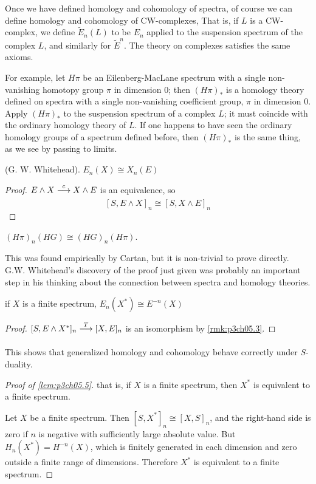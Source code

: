 \documentclass[../main]{subfiles}
\begin{document}
Once we have defined homology and cohomology of spectra, of course we can define homology and cohomology of CW-complexes, That is, if $L$ is a CW-complex, we define $\widetilde{E}_n(L)$ to be $E_n$ applied to the suspension spectrum of the complex $L$, and similarly for $\widetilde{E}^n$. The theory on complexes satisfies the same axioms.

For example, let $H\pi$ be an Eilenberg-MacLane spectrum with a single non-vanishing homotopy group $\pi$ in dimension 0; then $(H\pi)_\ast$ is a homology theory  defined on spectra with a single non-vanishing coefficient group, $\pi$ in dimension 0. Apply $(H\pi)_\ast$ to the suspension spectrum of a complex $L$; it must coincide with the ordinary homology theory of $L$. If one happens to have seen the ordinary homology groups of a spectrum defined before, then $(H\pi)_\ast$ is the same thing, as we see by passing to limits.

\begin{theorem}\label{thm:p3c06.2}
(G. W. Whitehead). $E_n(X) \cong X_n(E)$
\end{theorem}

\begin{proof}
$E\wedge X \lar{c} X \wedge E$ is an equivalence, so
\[[S, E\wedge X]_n \cong [S, X\wedge E]_n\]
\end{proof}

\begin{corollary}\label{cor:p3c06.3}
$(H\pi)_n(HG) \cong (HG)_n(H\pi)$.
\end{corollary}

This was found empirically by Cartan, but it is non-trivial to prove directly. G.W. Whitehead's discovery of the proof just given was probably an important step in his thinking about the connection between spectra and homology theories.

\begin{proposition}\label{prop:p3c06.4}
if $X$ is a finite spectrum, $E_n(X^\ast) \cong E^{-n}(X)$
\end{proposition}

\begin{proof}
$[S, E\wedge X^\ast]_n \lar{T} [X, E]_n$ is an isomorphism by \ref{rmk:p3ch05.3}.
\end{proof}
This shows that generalized homology and cohomology behave correctly under $S$-duality.

\begin{proof}[Proof of \ref{lem:p3ch05.5}]\label{proof:p3ch05.5}
that is, if $X$ is a finite spectrum, then $X^\ast$ is equivalent to a finite spectrum.

Let $X$ be a finite spectrum. Then $\left[ S, X^\ast \right]_n \cong [X, S]_n$, and the right-hand side is zero if $n$ is negative with sufficiently large absolute value. But $H_n(X^\ast)=H^{-n}(X)$, which is finitely generated in each dimension and zero outside a finite range of dimensions. Therefore $X^\ast$ is equivalent to a finite spectrum. 
\end{proof}
\end{document}
